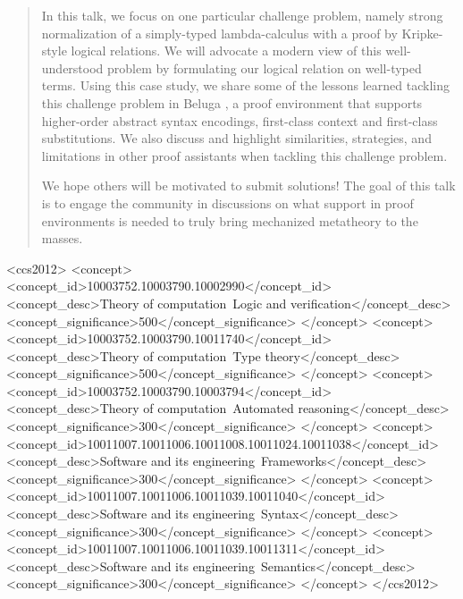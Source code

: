 \documentclass[sigplan,screen]{acmart}\settopmatter{}
\begin{document}
\begin{abstract}
In this talk, we
focus on one particular challenge problem, namely strong normalization
of a simply-typed lambda-calculus with a proof by Kripke-style logical
relations. We will advocate a modern view of this well-understood
problem by formulating our logical relation on well-typed terms. 
Using this case study, we share some
of the lessons learned tackling this challenge problem in Beluga \cite{PientkaC15}, a
proof environment that supports higher-order abstract syntax
encodings, first-class context and first-class substitutions. {We also
discuss and highlight similarities, strategies, and limitations 
in other proof assistants when tackling this challenge problem.}

We hope others will be motivated to submit solutions! The goal of this
talk is to engage the community in discussions on what support in
proof environments is needed to truly bring mechanized metatheory to
the masses.
\end{abstract}





 \begin{CCSXML}
<ccs2012>
<concept>
<concept_id>10003752.10003790.10002990</concept_id>
<concept_desc>Theory of computation~Logic and verification</concept_desc>
<concept_significance>500</concept_significance>
</concept>
<concept>
<concept_id>10003752.10003790.10011740</concept_id>
<concept_desc>Theory of computation~Type theory</concept_desc>
<concept_significance>500</concept_significance>
</concept>
<concept>
<concept_id>10003752.10003790.10003794</concept_id>
<concept_desc>Theory of computation~Automated reasoning</concept_desc>
<concept_significance>300</concept_significance>
</concept>
<concept>
<concept_id>10011007.10011006.10011008.10011024.10011038</concept_id>
<concept_desc>Software and its engineering~Frameworks</concept_desc>
<concept_significance>300</concept_significance>
</concept>
<concept>
<concept_id>10011007.10011006.10011039.10011040</concept_id>
<concept_desc>Software and its engineering~Syntax</concept_desc>
<concept_significance>300</concept_significance>
</concept>
<concept>
<concept_id>10011007.10011006.10011039.10011311</concept_id>
<concept_desc>Software and its engineering~Semantics</concept_desc>
<concept_significance>300</concept_significance>
</concept>
</ccs2012>
\end{CCSXML}
\end{document}
